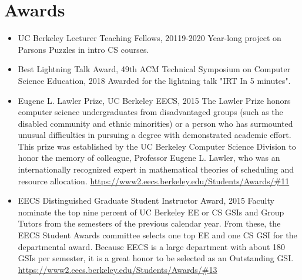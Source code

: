 \section{Awards}
\vspace{6pt}

\begin{itemize}

  \setlength\itemsep{1em}

    \item UC Berkeley Lecturer Teaching Fellows, 20119-2020
    \vspace{2pt}
    \newline\small Year-long project on Parsons Puzzles in intro CS courses.
    \vspace{2pt}
    
    \item Best Lightning Talk Award, 49th ACM Technical Symposium on Computer Science Education, 2018
    \vspace{2pt}
    \newline\small Awarded for the lightning talk "IRT In 5 minutes".
    \vspace{2pt}

    \item Eugene L. Lawler Prize, UC Berkeley EECS, 2015
    \vspace{2pt}
    \newline\small{The Lawler Prize honors computer science undergraduates from disadvantaged groups (such as the disabled community and ethnic minorities) or a person who has surmounted unusual difficulties in pursuing a degree with demonstrated academic effort. This prize was established by the UC Berkeley Computer Science Division to honor the memory of colleague, Professor Eugene L. Lawler, who was an internationally recognized expert in mathematical theories of scheduling and resource allocation.}
    \vspace{2pt}
    \small \href{https://www2.eecs.berkeley.edu/Students/Awards/\#11}{https://www2.eecs.berkeley.edu/Students/Awards/\#11}
    
    \item EECS Distinguished Graduate Student Instructor Award, 2015
    \vspace{2pt}
    \newline
    \small{Faculty nominate the top nine percent of UC Berkeley EE or CS GSIs and Group Tutors from the semesters of the previous calendar year. From these, the EECS Student Awards committee selects one top EE and one CS GSI for the departmental award. Because EECS is a large department with about 180 GSIs per semester, it is a great honor to be selected as an Outstanding GSI.}
    \vspace{2pt}
    \small\href{https://www2.eecs.berkeley.edu/Students/Awards/\#13}{https://www2.eecs.berkeley.edu/Students/Awards/\#13}

\end{itemize}

